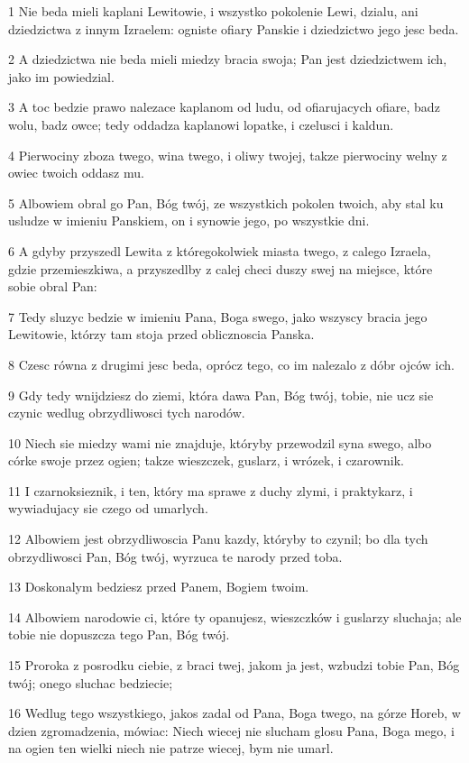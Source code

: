 \par 1 Nie beda mieli kaplani Lewitowie, i wszystko pokolenie Lewi, dzialu, ani dziedzictwa z innym Izraelem: ogniste ofiary Panskie i dziedzictwo jego jesc beda.
\par 2 A dziedzictwa nie beda mieli miedzy bracia swoja; Pan jest dziedzictwem ich, jako im powiedzial.
\par 3 A toc bedzie prawo nalezace kaplanom od ludu, od ofiarujacych ofiare, badz wolu, badz owce; tedy oddadza kaplanowi lopatke, i czelusci i kaldun.
\par 4 Pierwociny zboza twego, wina twego, i oliwy twojej, takze pierwociny welny z owiec twoich oddasz mu.
\par 5 Albowiem obral go Pan, Bóg twój, ze wszystkich pokolen twoich, aby stal ku usludze w imieniu Panskiem, on i synowie jego, po wszystkie dni.
\par 6 A gdyby przyszedl Lewita z któregokolwiek miasta twego, z calego Izraela, gdzie przemieszkiwa, a przyszedlby z calej checi duszy swej na miejsce, które sobie obral Pan:
\par 7 Tedy sluzyc bedzie w imieniu Pana, Boga swego, jako wszyscy bracia jego Lewitowie, którzy tam stoja przed oblicznoscia Panska.
\par 8 Czesc równa z drugimi jesc beda, oprócz tego, co im nalezalo z dóbr ojców ich.
\par 9 Gdy tedy wnijdziesz do ziemi, która dawa Pan, Bóg twój, tobie, nie ucz sie czynic wedlug obrzydliwosci tych narodów.
\par 10 Niech sie miedzy wami nie znajduje, któryby przewodzil syna swego, albo córke swoje przez ogien; takze wieszczek, guslarz, i wrózek, i czarownik.
\par 11 I czarnoksieznik, i ten, który ma sprawe z duchy zlymi, i praktykarz, i wywiadujacy sie czego od umarlych.
\par 12 Albowiem jest obrzydliwoscia Panu kazdy, któryby to czynil; bo dla tych obrzydliwosci Pan, Bóg twój, wyrzuca te narody przed toba.
\par 13 Doskonalym bedziesz przed Panem, Bogiem twoim.
\par 14 Albowiem narodowie ci, które ty opanujesz, wieszczków i guslarzy sluchaja; ale tobie nie dopuszcza tego Pan, Bóg twój.
\par 15 Proroka z posrodku ciebie, z braci twej, jakom ja jest, wzbudzi tobie Pan, Bóg twój; onego sluchac bedziecie;
\par 16 Wedlug tego wszystkiego, jakos zadal od Pana, Boga twego, na górze Horeb, w dzien zgromadzenia, mówiac: Niech wiecej nie slucham glosu Pana, Boga mego, i na ogien ten wielki niech nie patrze wiecej, bym nie umarl.
